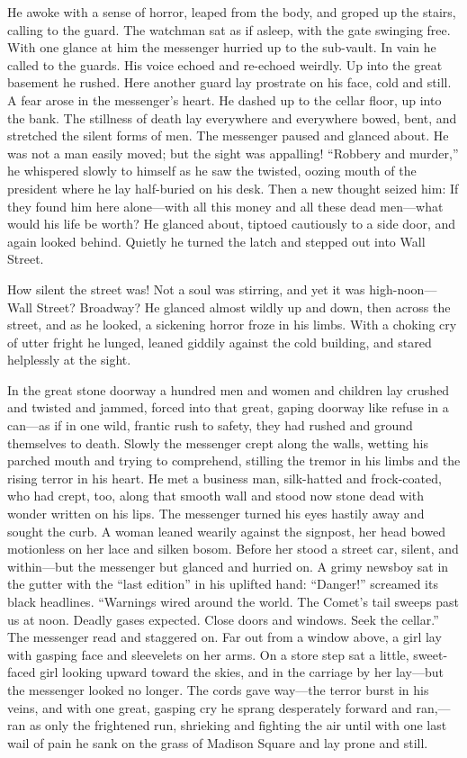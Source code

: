 He awoke with a sense of horror, leaped from the body, and
groped up the stairs, calling to the guard. The watchman sat as
if asleep, with the gate swinging free. With one glance at him
the messenger hurried up to the sub-vault. In vain he called to
the guards. His voice echoed and re-echoed weirdly. Up into the
great basement he rushed. Here another guard lay prostrate on
his face, cold and still. A fear arose in the messenger's heart.
He dashed up to the cellar floor, up into the bank. The
stillness of death lay everywhere and everywhere bowed, bent,
and stretched the silent forms of men. The messenger paused and
glanced about. He was not a man easily moved; but the sight was
appalling! ``Robbery and murder,'' he whispered slowly to himself
as he saw the twisted, oozing mouth of the president where he
lay half-buried on his desk. Then a new thought seized him: If
they found him here alone---with all this money and all these dead
men---what would his life be worth? He glanced about, tiptoed
cautiously to a side door, and again looked behind. Quietly he
turned the latch and stepped out into Wall Street.

How silent the street was! Not a soul was stirring, and yet it
was high-noon---Wall Street? Broadway? He glanced almost wildly up
and down, then across the street, and as he looked, a sickening
horror froze in his limbs. With a choking cry of utter fright he
lunged, leaned giddily against the cold building, and stared
helplessly at the sight.

In the great stone doorway a hundred men and women and children
lay crushed and twisted and jammed, forced into that great,
gaping doorway like refuse in a can---as if in one wild, frantic
rush to safety, they had rushed and ground themselves to death.
Slowly the messenger crept along the walls, wetting his parched
mouth and trying to comprehend, stilling the tremor in his limbs
and the rising terror in his heart. He met a business man,
silk-hatted and frock-coated, who had crept, too, along that
smooth wall and stood now stone dead with wonder written on his
lips. The messenger turned his eyes hastily away and sought the
curb. A woman leaned wearily against the signpost, her head
bowed motionless on her lace and silken bosom. Before her stood
a street car, silent, and within---but the messenger but glanced
and hurried on. A grimy newsboy sat in the gutter with the ``last
edition'' in his uplifted hand: ``Danger!'' screamed its black
headlines. ``Warnings wired around the world. The Comet's tail
sweeps past us at noon. Deadly gases expected. Close doors and
windows. Seek the cellar.'' The messenger read and staggered on.
Far out from a window above, a girl lay with gasping face and
sleevelets on her arms. On a store step sat a little,
sweet-faced girl looking upward toward the skies, and in the
carriage by her lay---but the messenger looked no longer. The
cords gave way---the terror burst in his veins, and with one
great, gasping cry he sprang desperately forward and ran,---ran as
only the frightened run, shrieking and fighting the air until
with one last wail of pain he sank on the grass of Madison
Square and lay prone and still.

